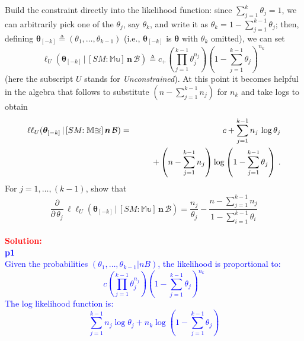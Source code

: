 \documentclass[12pt]{article}
\newcommand{\given}{\, | \,}
\begin{document}
\begin{itemize}
\begin{itemize}
\begin{itemize}
Build the constraint directly into the likelihood function: since $\sum_{ j = 1 }^k \theta_j = 1$, we can arbitrarily pick one of the $\theta_j$, say $\theta_k$, and write it as $\theta_k = 1 - \sum_{ j = 1 }^{ k - 1 } \theta_j$; then, defining $\bm{ \theta }_{ [ - k ] } \triangleq ( \theta_1, \dots, \theta_{ k - 1 } )$ (i.e., $\bm{ \theta }_{ [ - k ] }$ is $\bm{ \theta }$ with $\theta_k$ omitted), we can set
\begin{equation} \label{e:multinomial-5}
\ell_U ( \bm{ \theta }_{ [ - k ] } \given [ SM \! \! : \mathbb{ Mu } ] \, \bm{ n } \, \mathcal{ B } ) \triangleq c_+ \left( \prod_{ j = 1 }^{ k - 1 }\theta_j^{ n_j } \right) \left( 1 - \sum_{ j = 1 }^{ k - 1 } \theta_j \right)^{ n_k } \, 
\end{equation}
(here the subscript $U$ stands for \textit{Unconstrained}). At this point it becomes helpful in the algebra that follows to substitute $\left( n - \sum_{ j = 1 }^{ k - 1 } n_j \right)$ for $n_k$ and take logs to obtain
\begin{eqnarray} \label{e:multinomial-6}
\ell \ell_U ( \bm{ \theta }_{ [ - k ] } \given [ SM \! \! : \mathbb{ Mu } ] \, \bm{ n } \, \mathcal{ B } ) & = & c + \sum_{ j = 1 }^{ k - 1 } n_j \, \log \theta_j \nonumber \\ & & \hspace*{0.25in} + \left( n - \sum_{ j = 1 }^{ k - 1 } n_j \right) \log \left( 1 - \sum_{ j = 1 }^{ k - 1 } \theta_j \right) \, .
\end{eqnarray}
For $j = 1, \dots, ( k - 1 )$, show that
\begin{equation} \label{e:multinomial-7}
\frac{ \partial }{ \partial \, \theta_j } \, \ell \ell_U ( \bm{ \theta }_{ [ - k ] } \given [ SM \! \! : \mathbb{ Mu } ] \, \bm{ n } \, \mathcal{ B } ) = \frac{ n_j }{ \theta_j } - \frac{ n - \sum_{ j = 1 }^{ k - 1 } n_j }{ 1 - \sum_{ i = 1 }^{ k - 1 } \theta_i }
\end{equation}
\fbox{\textbf{\textit{[10 points]}}} \vspace*{0.1in} \\
\textcolor{red}{\textbf{Solution:}} \\
\textcolor{blue}{
\textbf{p1} \\
Given the probabilities \( (\theta_1, \ldots, \theta_{k-1} | n B) \), the likelihood is proportional to:
\[ c \left(\prod_{j=1}^{k-1} \theta_j^{n_j} \right) \left(1 - \sum_{j=1}^{k-1} \theta_j \right)^{n_k} \]
The log likelihood function is:
\[ \sum_{j=1}^{k-1} n_j \log \theta_j + n_k \log \left(1 - \sum_{j=1}^{k-1} \theta_j \right) \]
}
\end{itemize}
\end{itemize}
\end{itemize}
\end{document}
